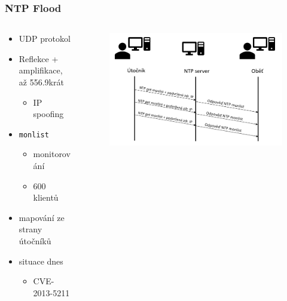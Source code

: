 \documentclass[%
  12pt,       				%
	t,                  %
	aspectratio=1610,   %
	unicode,						%
czech,              %
]{beamer}				    	%
\begin{document}
\begin{frame} 
	\frametitle{NTP Flood}
	
	\begin{columns}[T] 								%
		\begin{column}{0.4\textwidth}		%
			\begin{itemize}
				\item UDP protokol
				\item Reflekce + amplifikace, až 556.9krát
				\begin{itemize}
					\item IP spoofing
				\end{itemize}
				\item \texttt{monlist}
				\begin{itemize}
					\item monitorování
					\item 600 klientů
				\end{itemize}
				\item mapování ze strany útočníků
				\item situace dnes
				\begin{itemize}
					\item CVE-2013-5211
				\end{itemize}
			\end{itemize}
		\end{column}
		\begin{column}{0.6\textwidth}		%
			\begin{figure}%
				\centering
				\vspace{1cm}	              %
				\includegraphics[width=0.8\columnwidth]{obrazky/ntp_flood_schema.png}
			\end{figure}
		\end{column}
	\end{columns}											%
\end{frame}
\end{document}
